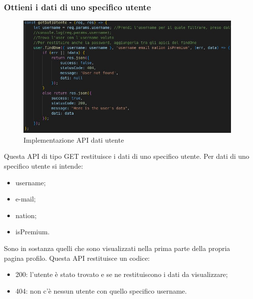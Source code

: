 \subsubsection{Ottieni i dati di uno specifico utente}
\begin{figure}[!h]
\centering
\includegraphics[scale=0.4]{images/api_dati_utente.jpg}
\caption{Implementazione API dati utente}
\label{fig:api_dati_utente}
\end{figure}
\noindent
Questa API di tipo GET restituisce i dati di uno specifico utente. Per dati di uno specifico utente si intende: 
\begin{itemize}
    \item username;
    \item e-mail;
    \item nation;
    \item isPremium.
\end{itemize}
Sono in sostanza quelli che sono visualizzati nella prima parte della propria pagina profilo. Questa API restituisce un codice:
\begin{itemize}
    \item 200: l'utente è stato trovato e se ne restituiscono i dati da visualizzare;
    \item 404: non c'è nessun utente con quello specifico username.
\end{itemize}

